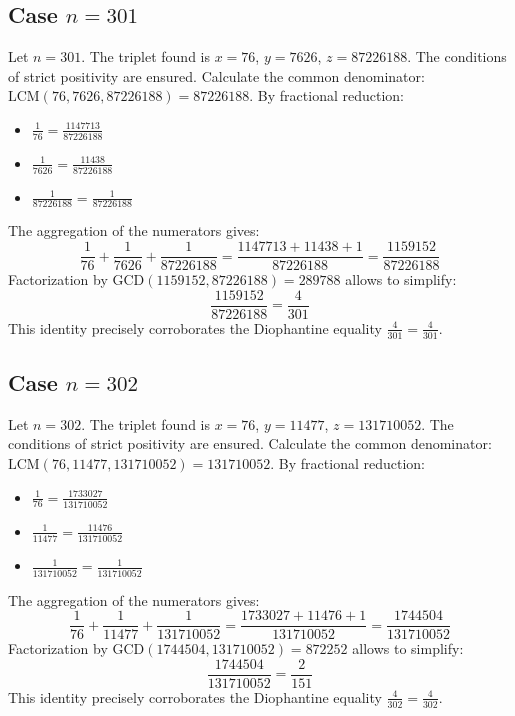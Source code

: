\documentclass[11pt,a4paper]{article}
\begin{document}
\subsection{Case $n = 301$}
Let $n = 301$. The triplet found is $x = 76$, $y = 7626$, $z = 87226188$.
The conditions of strict positivity are ensured.
Calculate the common denominator: $\text{LCM}(76, 7626, 87226188) = 87226188$.
By fractional reduction:
\begin{itemize}
    \item $\frac{1}{76} = \frac{1147713}{87226188}$
    \item $\frac{1}{7626} = \frac{11438}{87226188}$
    \item $\frac{1}{87226188} = \frac{1}{87226188}$
\end{itemize}
The aggregation of the numerators gives:
$$ \frac{1}{76} + \frac{1}{7626} + \frac{1}{87226188} = \frac{1147713 + 11438 + 1}{87226188} = \frac{1159152}{87226188} $$
Factorization by $\text{GCD}(1159152, 87226188) = 289788$ allows to simplify:
$$ \frac{1159152}{87226188} = \frac{4}{301} $$
This identity precisely corroborates the Diophantine equality $\frac{4}{301} = \frac{4}{301}$.

\subsection{Case $n = 302$}
Let $n = 302$. The triplet found is $x = 76$, $y = 11477$, $z = 131710052$.
The conditions of strict positivity are ensured.
Calculate the common denominator: $\text{LCM}(76, 11477, 131710052) = 131710052$.
By fractional reduction:
\begin{itemize}
    \item $\frac{1}{76} = \frac{1733027}{131710052}$
    \item $\frac{1}{11477} = \frac{11476}{131710052}$
    \item $\frac{1}{131710052} = \frac{1}{131710052}$
\end{itemize}
The aggregation of the numerators gives:
$$ \frac{1}{76} + \frac{1}{11477} + \frac{1}{131710052} = \frac{1733027 + 11476 + 1}{131710052} = \frac{1744504}{131710052} $$
Factorization by $\text{GCD}(1744504, 131710052) = 872252$ allows to simplify:
$$ \frac{1744504}{131710052} = \frac{2}{151} $$
This identity precisely corroborates the Diophantine equality $\frac{4}{302} = \frac{4}{302}$.
\end{document}

